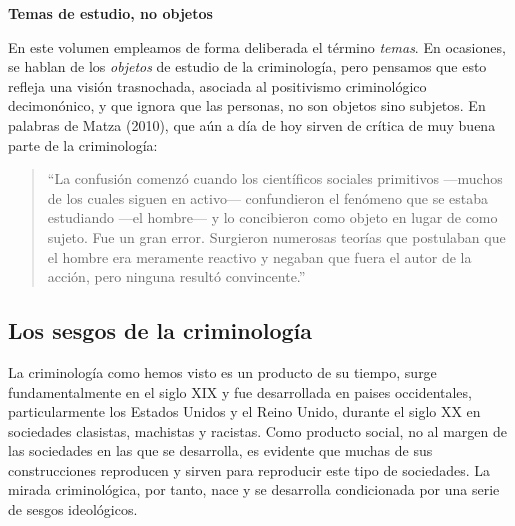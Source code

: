 \documentclass[
  spanish,
  letterpaper,
  DIV=11,
  numbers=noendperiod]{scrreprt}
\begin{document}
\begin{tcolorbox}[enhanced jigsaw, bottomtitle=1mm, toprule=.15mm, colbacktitle=quarto-callout-note-color!10!white, bottomrule=.15mm, leftrule=.75mm, colframe=quarto-callout-note-color-frame, opacitybacktitle=0.6, titlerule=0mm, breakable, colback=white, left=2mm, arc=.35mm, title=\textcolor{quarto-callout-note-color}{\faInfo}\hspace{0.5em}{Nota}, toptitle=1mm, coltitle=black, rightrule=.15mm, opacityback=0]

\textbf{Temas de estudio, no objetos}

En este volumen empleamos de forma deliberada el término \emph{temas}.
En ocasiones, se hablan de los \emph{objetos} de estudio de la
criminología, pero pensamos que esto refleja una visión trasnochada,
asociada al positivismo criminológico decimonónico, y que ignora que las
personas, no son objetos sino subjetos. En palabras de Matza (2010), que
aún a día de hoy sirven de crítica de muy buena parte de la
criminología:

\begin{quote}
``La confusión comenzó cuando los científicos sociales primitivos
---muchos de los cuales siguen en activo--- confundieron el fenómeno que
se estaba estudiando ---el hombre--- y lo concibieron como objeto en
lugar de como sujeto. Fue un gran error. Surgieron numerosas teorías que
postulaban que el hombre era meramente reactivo y negaban que fuera el
autor de la acción, pero ninguna resultó convincente.''
\end{quote}

\end{tcolorbox}

\subsection{Los sesgos de la
criminología}\label{los-sesgos-de-la-criminologuxeda}

La criminología como hemos visto es un producto de su tiempo, surge
fundamentalmente en el siglo XIX y fue desarrollada en paises
occidentales, particularmente los Estados Unidos y el Reino Unido,
durante el siglo XX en sociedades clasistas, machistas y racistas. Como
producto social, no al margen de las sociedades en las que se
desarrolla, es evidente que muchas de sus construcciones reproducen y
sirven para reproducir este tipo de sociedades. La mirada criminológica,
por tanto, nace y se desarrolla condicionada por una serie de sesgos
ideológicos.
\end{document}
